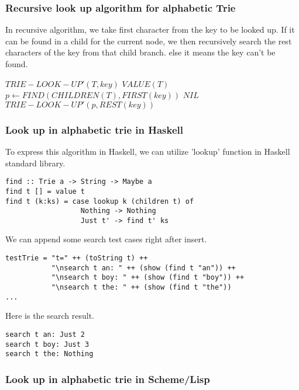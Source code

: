 \documentclass{article}
\begin{document}
\subsubsection{Recursive look up algorithm for alphabetic Trie}

In recursive algorithm, we take first character from the key to be
looked up. If it can be found in a child for the current node, we then
recursively search the rest characters of the key from that child
branch. else it means the key can't be found.

\begin{algorithmic}
\STATE $TRIE-LOOK-UP'(T, key)$
    \RETURN $VALUE(T)$
  \ENDIF
  \STATE $p \leftarrow FIND(CHILDREN(T), FIRST(key))$
    \RETURN $NIL$
  \ELSE
    \RETURN $TRIE-LOOK-UP'(p, REST(key))$
  \ENDIF
\end{algorithmic}

\subsubsection*{Look up in alphabetic trie in Haskell}
To express this algorithm in Haskell, we can utilize 'lookup' function
in Haskell standard library\cite{wiki-trie}.

\lstset{language=Haskell}
\begin{lstlisting}
find :: Trie a -> String -> Maybe a
find t [] = value t
find t (k:ks) = case lookup k (children t) of
                  Nothing -> Nothing
                  Just t' -> find t' ks
\end{lstlisting}

We can append some search test cases right after insert.

\begin{lstlisting}
testTrie = "t=" ++ (toString t) ++ 
           "\nsearch t an: " ++ (show (find t "an")) ++
           "\nsearch t boy: " ++ (show (find t "boy")) ++
           "\nsearch t the: " ++ (show (find t "the"))
...
\end{lstlisting}

Here is the search result.

\begin{verbatim}
search t an: Just 2
search t boy: Just 3
search t the: Nothing
\end{verbatim}


\subsubsection*{Look up in alphabetic trie in Scheme/Lisp}
\end{document}
